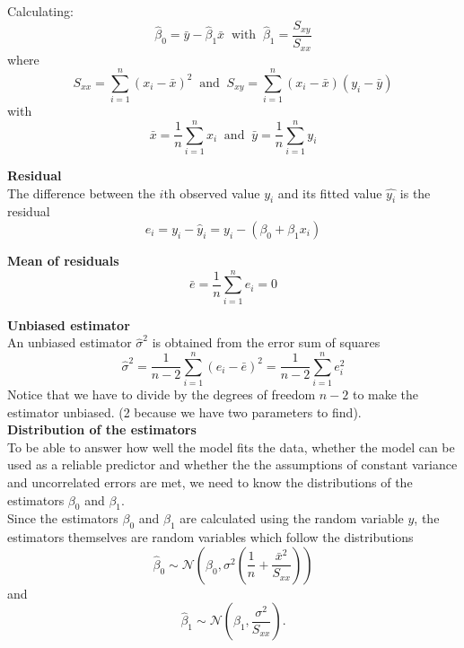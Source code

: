 Calculating:
\begin{equation}
  \hat{\beta}_0 = \bar{y} - \hat{\beta}_1\bar{x} \;\;\text{with}\;\; \hat{\beta}_1 = \frac{S_{xy}}{S_{xx}}
\end{equation}
where
\begin{equation}
  S_{xx} =  \sum^n_{i=1}(x_i - \bar{x})^2 \;\;\text{and}\;\; S_{xy} =  \sum^n_{i=1}(x_i - \bar{x})(y_i - \bar{y})
\end{equation}
with
\begin{equation}
  \bar{x} = \frac{1}{n}\sum_{i=1}^n x_i  \;\;\text{and}\;\; \bar{y} = \frac{1}{n}\sum_{i=1}^n y_i
\end{equation}

\textbf{Residual}\\
The difference between the $i$th observed value $y_i$ and its fitted value $\hat{y_i}$ is the residual
\begin{equation}
  e_i = y_i - \hat{y}_i = y_i - (\beta_0 + \beta_1x_i)
\end{equation}

\textbf{Mean of residuals}\\
\begin{equation}
  \bar{e} = \frac{1}{n} \sum_{i=1}^n e_i = 0
\end{equation}

\textbf{Unbiased estimator}\\
An unbiased estimator $\hat{\sigma}^2$  is obtained from the error sum of squares
\begin{equation}
  \hat{\sigma}^2 = \frac{1}{n - 2} \sum_{i=1}^n (e_i - \bar{e})^2 = \frac{1}{n - 2} \sum_{i=1}^n e_i^2
\end{equation}
Notice that we have to divide by the degrees of freedom $n - 2$ to make the estimator unbiased. (2 because we have two parameters to find).\\

\textbf{Distribution of the estimators}\\
To be able to answer how well the model fits the data, whether the model can be used as a reliable predictor and whether the the assumptions of constant variance and uncorrelated errors are met, we need to know the distributions of the estimators $\beta_0$ and $\beta_1$.\\
Since the estimators $\beta_0$ and $\beta_1$ are calculated using the random variable $y$, the estimators themselves are random variables which follow the distributions
\begin{equation}
  \hat{\beta}_0 \sim \mathcal{N}\left(\beta_0, \sigma^2\left(\frac{1}{n} + \frac{\bar{x}^2}{S_{xx}}\right)\right)
\end{equation}
and
\begin{equation}
  \hat{\beta}_1 \sim \mathcal{N}\left(\beta_1, \frac{\sigma^2}{S_{xx}}\right).
\end{equation}

